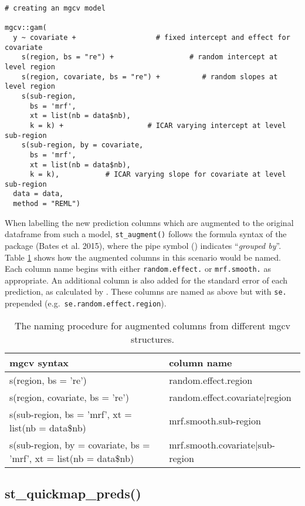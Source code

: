 \begin{verbatim}
# creating an mgcv model

mgcv::gam(
  y ~ covariate +                   # fixed intercept and effect for covariate  
    s(region, bs = "re") +                  # random intercept at level region
    s(region, covariate, bs = "re") +          # random slopes at level region
    s(sub-region, 
      bs = 'mrf',
      xt = list(nb = data$nb), 
      k = k) +                    # ICAR varying intercept at level sub-region
    s(sub-region, by = covariate, 
      bs = 'mrf',
      xt = list(nb = data$nb), 
      k = k),           # ICAR varying slope for covariate at level sub-region
  data = data, 
  method = "REML")
\end{verbatim}

When labelling the new prediction columns which are augmented to the original dataframe from such a model, \texttt{st\_augment()} follows the formula syntax of the  package (Bates et al. 2015), where the pipe symbol (\texttt{\textbar{}}) indicates ``\emph{grouped by}''. Table \ref{tab:staugtab-latex} shows how the augmented columns in this scenario would be named. Each column name begins with either \texttt{random.effect.} or \texttt{mrf.smooth.} as appropriate. An additional column is also added for the standard error of each prediction, as calculated by . These columns are named as above but with \texttt{se.} prepended (e.g.~\texttt{se.random.effect.region}).

\begin{table}

\caption{\label{tab:staugtab-latex}The naming procedure for augmented columns from different mgcv structures.}
\centering
\fontsize{9}{11}\selectfont
\begin{tabular}[t]{l|l}
\hline
\textbf{mgcv syntax} & \textbf{column name}\\
\hline
s(region, bs = 're') & random.effect.region\\
\hline
s(region, covariate, bs = 're') & random.effect.covariate|region\\
\hline
s(sub-region, bs = 'mrf', xt = list(nb = data\$nb) & mrf.smooth.sub-region\\
\hline
s(sub-region, by = covariate, bs = 'mrf', xt = list(nb = data\$nb) & mrf.smooth.covariate|sub-region\\
\hline
\end{tabular}
\end{table}

\hypertarget{st_quickmap_preds}{%
\subsection{st\_quickmap\_preds()}\label{st_quickmap_preds}}

